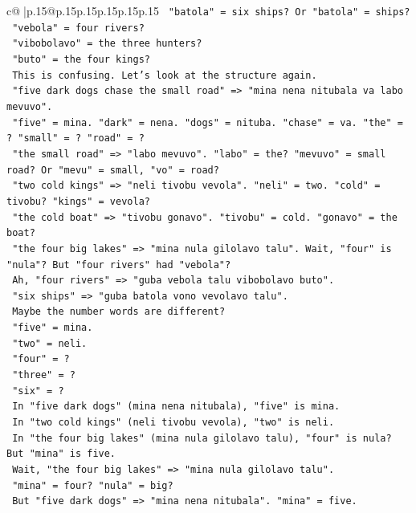 \documentclass{article}
\begin{document}
{\begin{supertabular}{c@{$\;$}|p{.15\linewidth}@{}p{.15\linewidth}p{.15\linewidth}p{.15\linewidth}p{.15\linewidth}p{.15\linewidth}}
{{{\texttt{   "batola" = six ships? Or "batola" = ships?} \\
\texttt{   "vebola" = four rivers?} \\
\texttt{   "vibobolavo" = the three hunters?} \\
\texttt{   "buto" = the four kings?} \\
\texttt{   This is confusing. Let's look at the structure again.} \\
\texttt{   "five dark dogs chase the small road" => "mina nena nitubala va labo mevuvo".} \\
\texttt{   "five" = mina. "dark" = nena. "dogs" = nituba. "chase" = va. "the" = ? "small" = ? "road" = ?} \\
\texttt{   "the small road" => "labo mevuvo". "labo" = the? "mevuvo" = small road? Or "mevu" = small, "vo" = road?} \\
\texttt{   "two cold kings" => "neli tivobu vevola". "neli" = two. "cold" = tivobu? "kings" = vevola?} \\
\texttt{   "the cold boat" => "tivobu gonavo". "tivobu" = cold. "gonavo" = the boat?} \\
\texttt{   "the four big lakes" => "mina nula gilolavo talu". Wait, "four" is "nula"? But "four rivers" had "vebola"?} \\
\texttt{   Ah, "four rivers" => "guba vebola talu vibobolavo buto".} \\
\texttt{   "six ships" => "guba batola vono vevolavo talu".} \\
\texttt{   Maybe the number words are different?} \\
\texttt{   "five" = mina.} \\
\texttt{   "two" = neli.} \\
\texttt{   "four" = ?} \\
\texttt{   "three" = ?} \\
\texttt{   "six" = ?} \\
\texttt{   In "five dark dogs" (mina nena nitubala), "five" is mina.} \\
\texttt{   In "two cold kings" (neli tivobu vevola), "two" is neli.} \\
\texttt{   In "the four big lakes" (mina nula gilolavo talu), "four" is nula? But "mina" is five.} \\
\texttt{   Wait, "the four big lakes" => "mina nula gilolavo talu".} \\
\texttt{   "mina" = four? "nula" = big?} \\
\texttt{   But "five dark dogs" => "mina nena nitubala". "mina" = five.} \\
}}}
\end{supertabular}}
\end{document}
